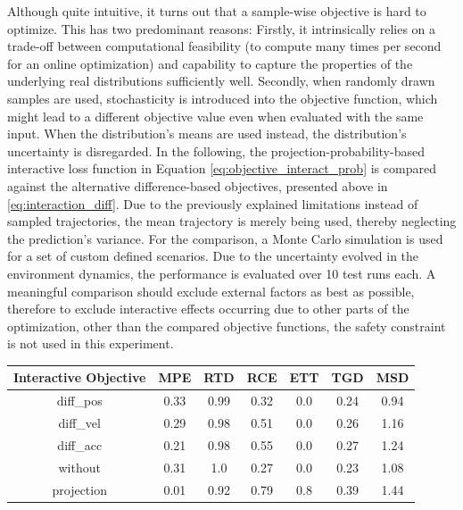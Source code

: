 Although quite intuitive, it turns out that a sample-wise objective is hard to optimize. This has two predominant reasons: Firstly, it intrinsically relies on a trade-off between computational feasibility (to compute many times per second for an online optimization) and capability to capture the properties of the underlying real distributions sufficiently well. Secondly, when randomly drawn samples are used, stochasticity is introduced into the objective function, which might lead to a different objective value even when evaluated with the same input. When the distribution's means are used instead, the distribution's uncertainty is disregarded.
\newline
In the following, the projection-probability-based interactive loss function in Equation \ref{eq:objective_interact_prob} is compared against the alternative difference-based objectives, presented above in \ref{eq:interaction_diff}. Due to the previously explained limitations instead of sampled trajectories, the mean trajectory is merely being used, thereby neglecting the prediction's variance. For the comparison, a Monte Carlo simulation is used for a set of custom defined scenarios. Due to the uncertainty evolved in the environment dynamics, the performance is evaluated over 10 test runs each. A meaningful comparison should exclude external factors as best as possible, therefore to exclude interactive effects occurring due to other parts of the optimization, other than the compared objective functions, the safety constraint is not used in this experiment. \\ 

\begin{table}[!ht]
\begin{center}
\begin{tabular}{c|c|c|c|c|c|c}
\bf Interactive Objective & \bf MPE & \bf RTD & \bf RCE & \bf ETT & \bf TGD & \bf MSD \\
\hline
diff\_pos & 0.33 & 0.99 & 0.32 & 0.0 & 0.24 & 0.94 \\
\hline
diff\_vel & 0.29 & 0.98 & 0.51 & 0.0 & 0.26 & 1.16 \\
\hline
diff\_acc & 0.21 & 0.98 & 0.55 & 0.0 & 0.27 & 1.24 \\ 
\hline
\rowcolor{baseline_color}
without & 0.31 & 1.0 & 0.27 & 0.0 & 0.23 & 1.08 \\ 
\hline
\rowcolor{our_color}
projection & 0.01 & 0.92 & 0.79 & 0.8 & 0.39 & 1.44 
\end{tabular}
\end{center}
\label{table:interactive_objective}
\end{table}

